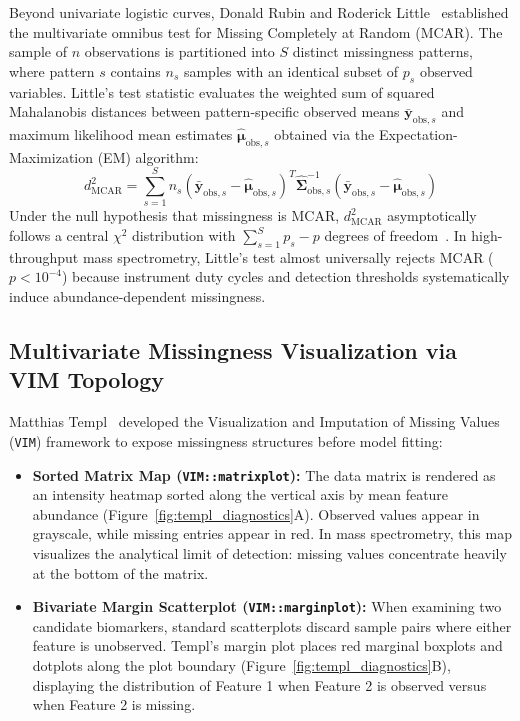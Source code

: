\documentclass[11pt,oneside]{book}
\begin{document}
Beyond univariate logistic curves, Donald Rubin and Roderick Little~\cite{little1988test, templ2023visualization} established the multivariate omnibus test for Missing Completely at Random (MCAR). The sample of $n$ observations is partitioned into $S$ distinct missingness patterns, where pattern $s$ contains $n_s$ samples with an identical subset of $p_s$ observed variables. Little's test statistic evaluates the weighted sum of squared Mahalanobis distances between pattern-specific observed means $\bar{\mathbf{y}}_{\text{obs}, s}$ and maximum likelihood mean estimates $\hat{\boldsymbol{\mu}}_{\text{obs}, s}$ obtained via the Expectation-Maximization (EM) algorithm:
\begin{equation}
\label{eq:little_mcar}
d_{\text{MCAR}}^2 = \sum_{s=1}^S n_s \left( \bar{\mathbf{y}}_{\text{obs}, s} - \hat{\boldsymbol{\mu}}_{\text{obs}, s} \right)^T \hat{\boldsymbol{\Sigma}}_{\text{obs}, s}^{-1} \left( \bar{\mathbf{y}}_{\text{obs}, s} - \hat{\boldsymbol{\mu}}_{\text{obs}, s} \right)
\end{equation}
Under the null hypothesis that missingness is MCAR, $d_{\text{MCAR}}^2$ asymptotically follows a central $\chi^2$ distribution with $\sum_{s=1}^S p_s - p$ degrees of freedom~\cite{little1988test, templ2023visualization}. In high-throughput mass spectrometry, Little's test almost universally rejects MCAR ($p < 10^{-4}$) because instrument duty cycles and detection thresholds systematically induce abundance-dependent missingness.

\subsection{Multivariate Missingness Visualization via VIM Topology}

Matthias Templ~\cite{templ2023visualization} developed the Visualization and Imputation of Missing Values (\texttt{VIM}) framework to expose missingness structures before model fitting:
\begin{itemize}
    \item \textbf{Sorted Matrix Map (\texttt{VIM::matrixplot}):} The data matrix is rendered as an intensity heatmap sorted along the vertical axis by mean feature abundance (Figure~\ref{fig:templ_diagnostics}A). Observed values appear in grayscale, while missing entries appear in red. In mass spectrometry, this map visualizes the analytical limit of detection: missing values concentrate heavily at the bottom of the matrix.
    \item \textbf{Bivariate Margin Scatterplot (\texttt{VIM::marginplot}):} When examining two candidate biomarkers, standard scatterplots discard sample pairs where either feature is unobserved. Templ's margin plot places red marginal boxplots and dotplots along the plot boundary (Figure~\ref{fig:templ_diagnostics}B), displaying the distribution of Feature 1 when Feature 2 is observed versus when Feature 2 is missing.
\end{itemize}
\end{document}
